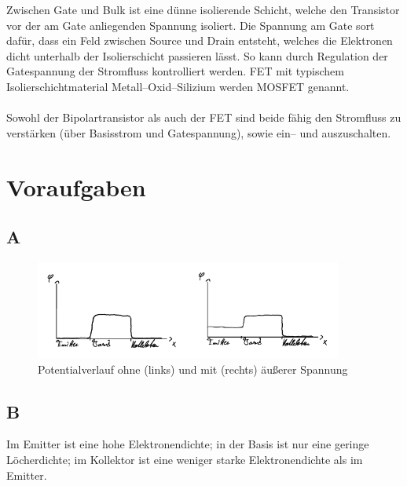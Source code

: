 \documentclass[a4paper,12pt]{article}
\numberwithin{equation}{section}
\begin{document}
Zwischen Gate und Bulk ist eine dünne isolierende Schicht, welche den Transistor vor der am Gate anliegenden Spannung isoliert.
Die Spannung am Gate sort dafür, dass ein Feld zwischen Source und Drain entsteht, welches die Elektronen dicht unterhalb der Isolierschicht passieren lässt.
So kann durch Regulation der Gatespannung der Stromfluss kontrolliert werden.
FET mit typischem Isolierschichtmaterial Metall--Oxid--Silizium werden MOSFET genannt.
\\\\ Sowohl der Bipolartransistor als auch der FET sind beide fähig den Stromfluss zu verstärken (über Basisstrom und Gatespannung), sowie ein-- und auszuschalten.


\clearpage
\section{Voraufgaben}
\subsection{A}
\begin{figure}[h]
        \centering
        \includegraphics[width=0.9\textwidth]{A_crop.pdf}
        \caption[Potentialverlauf ohne und mit äußerer Spannung]{Potentialverlauf ohne (links) und mit (rechts) äußerer Spannung}
\end{figure}

\subsection{B}
Im Emitter ist eine hohe Elektronendichte; in der Basis ist nur eine geringe Löcherdichte; im Kollektor ist eine weniger starke Elektronendichte als im Emitter.
\end{document}
